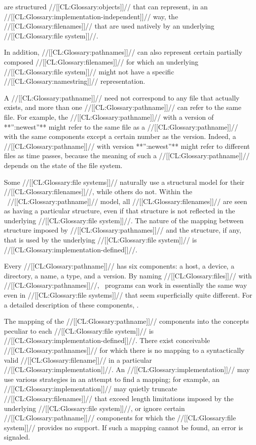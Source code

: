  are structured //[[CL:Glossary:objects]]// that can represent, in an //[[CL:Glossary:implementation-independent]]// way, the //[[CL:Glossary:filenames]]// that are used natively by an underlying //[[CL:Glossary:file system]]//.

In addition, //[[CL:Glossary:pathnames]]// can also represent certain partially composed  //[[CL:Glossary:filenames]]// for which an underlying //[[CL:Glossary:file system]]//  might not have a specific //[[CL:Glossary:namestring]]// representation.

A //[[CL:Glossary:pathname]]// need not correspond to any file that actually exists,  and more than one //[[CL:Glossary:pathname]]// can refer to the same file. For example, the //[[CL:Glossary:pathname]]// with a version of **'':newest''**  might refer to the same file as a //[[CL:Glossary:pathname]]//  with the same components except a certain number as the version. Indeed, a //[[CL:Glossary:pathname]]// with version **'':newest''** might refer to different files as time passes, because the meaning of such a //[[CL:Glossary:pathname]]// depends on the state of the file system.  

Some //[[CL:Glossary:file systems]]// naturally use a structural model for their //[[CL:Glossary:filenames]]//, while others do not.  Within the \clisp\ //[[CL:Glossary:pathname]]// model,  all //[[CL:Glossary:filenames]]// are seen as having a particular structure, even if that structure is not reflected in the underlying //[[CL:Glossary:file system]]//. The nature of the mapping between structure imposed by //[[CL:Glossary:pathnames]]// and the structure, if any, that is used by the underlying //[[CL:Glossary:file system]]// is //[[CL:Glossary:implementation-defined]]//.

Every //[[CL:Glossary:pathname]]// has six components:
     a host,
     a device,
     a directory,
     a name,
     a type,
 and a version. By naming //[[CL:Glossary:files]]// with //[[CL:Glossary:pathnames]]//,  \clisp\ programs can work in essentially the same way even in //[[CL:Glossary:file systems]]// that seem superficially quite different. For a detailed description of these components, \seesection\PathnameComponents.


The mapping of the //[[CL:Glossary:pathname]]// components into the concepts peculiar to each //[[CL:Glossary:file system]]// is //[[CL:Glossary:implementation-defined]]//. There exist conceivable //[[CL:Glossary:pathnames]]// for which there is no mapping to a syntactically valid //[[CL:Glossary:filename]]// in a particular //[[CL:Glossary:implementation]]//. An //[[CL:Glossary:implementation]]// may use various strategies in an attempt to find a mapping; for example,  an //[[CL:Glossary:implementation]]// may quietly truncate //[[CL:Glossary:filenames]]// that exceed length limitations imposed by the underlying //[[CL:Glossary:file system]]//, or ignore certain //[[CL:Glossary:pathname]]// components for which the //[[CL:Glossary:file system]]// provides no support. If such a mapping cannot be found, an error  is signaled.

